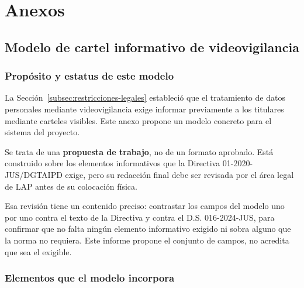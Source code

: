 \section{Anexos}
\label{sec:anexos}

\renewcommand{\thesubsection}{\Alph{subsection}}
\renewcommand{\thesubsubsection}{\thesubsection.\arabic{subsubsection}}
\setcounter{subsection}{0}

\subsection{Modelo de cartel informativo de videovigilancia}
\label{anx:cartel}

\subsubsection{Propósito y estatus de este modelo}

La Sección~\ref{subsec:restricciones-legales} estableció que el tratamiento de datos
personales mediante videovigilancia exige informar previamente a los
titulares mediante carteles visibles. Este anexo propone un modelo
concreto para el sistema del proyecto.

Se trata de una \textbf{propuesta de
trabajo}, no de un formato aprobado. Está construido sobre los elementos
informativos que la Directiva 01-2020-JUS/DGTAIPD exige, pero su
redacción final debe ser revisada por el área legal de LAP antes de su
colocación física.

Esa revisión tiene un contenido preciso: contrastar los campos del modelo
uno por uno contra el texto de la Directiva y contra el D.S.
016-2024-JUS, para confirmar que no falta ningún elemento informativo
exigido ni sobra alguno que la norma no requiera. Este informe propone el
conjunto de campos, no acredita que sea el exigible.

\subsubsection{Elementos que el modelo incorpora}

